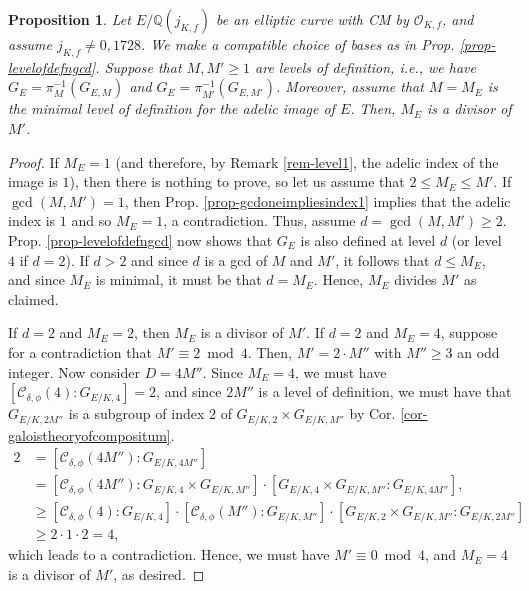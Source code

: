 \documentclass[11pt]{amsart}
\newtheorem{prop}[defn]{Proposition}
\theoremstyle{definition}
\newcommand{\Q}{\mathbb{Q}}
\newcommand{\Of}{\mathcal{O}_{K,f}}
\begin{document}
\begin{prop}\label{prop-minimalleveldivideslevelsofdef}
    Let $E/\Q(j_{K,f})$ be an elliptic curve with CM by $\Of$, and assume $j_{K,f} \neq 0, 1728$. We make a compatible choice of bases as in Prop. \ref{prop-levelofdefngcd}. Suppose that $M, M' \geq 1$ are levels of definition, i.e., we have $G_{E} = \pi_{M}^{-1}(G_{E, M})$ and $G_{E} = \pi_{M'}^{-1}(G_{E, M'})$. Moreover, assume that $M=M_E$ is the minimal level of definition for the adelic image of $E$. Then, $M_E$ is a divisor of $M'$.
\end{prop}
\begin{proof}
    If $M_E=1$ (and therefore, by Remark \ref{rem-level1}, the adelic index of the image is $1$), then there is nothing to prove, so let us assume that $2\leq M_E\leq M'$. If $\gcd(M,M')=1$, then Prop. \ref{prop-gcdoneimpliesindex1} implies that the adelic index is $1$ and so $M_E=1$, a contradiction. Thus, assume $d=\gcd(M,M')\geq 2$. Prop. \ref{prop-levelofdefngcd} now shows that $G_E$ is also defined at level $d$ (or level $4$ if $d=2$). If $d>2$ and since $d$ is a gcd of $M$ and $M'$, it follows that $d\leq M_E$, and since $M_E$ is minimal, it must be that $d=M_E$. Hence, $M_E$ divides $M'$ as claimed.

    If $d=2$ and $M_E=2$, then $M_E$ is a divisor of $M'$. If $d=2$ and $M_E=4$, suppose for a contradiction that $M'\equiv 2 \bmod 4$. Then, $M'=2\cdot M''$ with $M''\geq 3$ an odd integer. Now consider $D=4M''$. Since $M_E=4$, we must have $[\mathcal{C}_{\delta, \phi}(4) : G_{E/K, 4}] = 2$, and since $2M''$ is a level of definition, we must have that $G_{E/K,2M''}$ is a subgroup of index $2$ of $G_{E/K,2}\times G_{E/K,M''}$ by Cor. \ref{cor-galoistheoryofcompositum}. 
         \begin{align*} 2 &=[\mathcal{C}_{\delta, \phi}(4M''): G_{E/K,4M''}] \\
         &= [\mathcal{C}_{\delta, \phi}(4M''):G_{E/K,4}\times G_{E/K,M''}]\cdot [G_{E/K,4}\times G_{E/K,M''}:G_{E/K,4M''}],\\
          &\geq [\mathcal{C}_{\delta, \phi}(4):G_{E/K,4}] \cdot [\mathcal{C}_{\delta, \phi}(M''):G_{E/K,M''}]\cdot [G_{E/K,2}\times G_{E/K,M''}:G_{E/K,2M''}] \\
          &\geq 2\cdot 1 \cdot 2 = 4,
         \end{align*}
         which leads to a contradiction. Hence, we must have $M'\equiv 0 \bmod 4$, and $M_E=4$ is a divisor of $M'$, as desired.
\end{proof}
\end{document}
